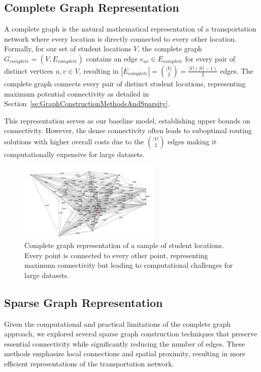 \subsection{Complete Graph Representation}
\label{subsec:complete_graph}

A complete graph is the natural mathematical representation of a transportation network where every location is directly connected to every other location. Formally, for our set of student locations $V$, the complete graph $G_{complete} = (V, E_{complete})$ contains an edge $e_{uv} \in E_{complete}$ for every pair of distinct vertices $u, v \in V$, resulting in $|E_{complete}| = {|V| \choose 2} = \frac{|V|(|V|-1)}{2}$ edges. The complete graph connects every pair of distinct student locations, representing maximum potential connectivity as detailed in Section~\ref{se:GraphConstructionMethodsAndSparsity}.

This representation serves as our baseline model, establishing upper bounds on connectivity. However, the dense connectivity often leads to suboptimal routing solutions with higher overall costs due to the ${|V| \choose 2}$ edges making it computationally expensive for large datasets.

\begin{figure}[!htbp]
\centering
\includegraphics[width=0.6\textwidth]{img/complete}
\caption{Complete graph representation of a sample of student locations. Every point is connected to every other point, representing maximum connectivity but leading to computational challenges for large datasets.}
\label{fig:complete_graph}
\end{figure}



\subsection{Sparse Graph Representation}
\label{subsec:sparse_graph}

Given the computational and practical limitations of the complete graph approach, we explored several sparse graph construction techniques that preserve essential connectivity while significantly reducing the number of edges. These methods emphasize local connections and spatial proximity, resulting in more efficient representations of the transportation network.


